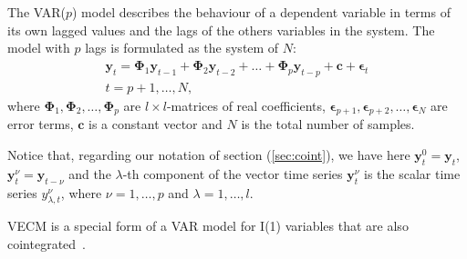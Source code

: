 \documentclass[twocolumn]{svjour3}          %
\begin{document}
The VAR($p$) model describes the behaviour of a dependent variable in terms of
its own lagged values and the lags of the others variables in the system. The
model with $p$ lags is formulated as the system of $N$:
\begin{align}
\label{eq:var}
\mathbf{y}_t 
= \boldsymbol{\Phi}_1 \mathbf{y}_{t-1} +
  \boldsymbol{\Phi}_2 \mathbf{y}_{t-2} + \dots +
  \boldsymbol{\Phi}_p\mathbf{y}_{t-p} +
  \mathbf{c} + \boldsymbol{\epsilon}_t \nonumber \\
t=p+1,\dots,N,
\end{align}
\noindent where 
$\boldsymbol{\Phi}_1, \boldsymbol{\Phi}_2,\dots,\boldsymbol{\Phi}_p$
are $l\times l$-matrices of real coefficients,
$\boldsymbol{\epsilon}_{p+1},
 \boldsymbol{\epsilon}_{p+2}, \dots, \boldsymbol{\epsilon}_N$ 
are error terms, $\mathbf{c}$ is a constant vector and $N$ is the total
number of samples.

Notice that, regarding our notation of section (\ref{sec:coint}),
we have here 
$\mathbf{y}_t^0 = \mathbf{y}_t$,
$\mathbf{y}_t^\nu = \mathbf{y}_{t-\nu}$ and
the $\lambda$-th component of the vector time series $\mathbf{y}_t^\nu$
is the scalar time series $y_{\lambda,t}^\nu$, where $\nu=1,\dots,p$ and
$\lambda=1,\dots,l$.

VECM is a special form of a VAR model for I(1) variables that are also
cointegrated~\cite{banerjee1993}.
\end{document}
